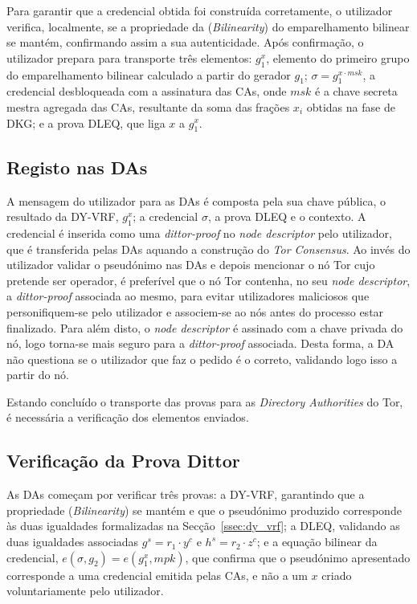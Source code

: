 Para garantir que a credencial obtida foi construída corretamente, o utilizador verifica, localmente, se a propriedade da (\textit{Bilinearity}) do emparelhamento bilinear se mantém, confirmando assim a sua autenticidade. Após confirmação, o utilizador prepara para transporte três elementos: $g_1^x$, elemento do primeiro grupo do emparelhamento bilinear calculado a partir do gerador $g_1$; $\sigma = g_1^{x \cdot msk}$, a credencial desbloqueada com a assinatura das CAs, onde $msk$ é a chave secreta mestra agregada das CAs, resultante da soma das frações $x_i$ obtidas na fase de DKG; e a prova DLEQ, que liga $x$ a $g_1^x$.

\subsection{Registo nas DAs}
\label{sub:dittor_protocolo_registo_das}

A mensagem do utilizador para as DAs é composta pela sua chave pública, o resultado da DY-VRF, $g_1^x$; a credencial $\sigma$, a prova DLEQ e o contexto. A credencial é inserida como uma \textit{dittor-proof} no \textit{node descriptor} pelo utilizador, que é transferida pelas DAs aquando a construção do \textit{Tor Consensus}. Ao invés do utilizador validar o pseudónimo nas DAs e depois mencionar o nó Tor cujo pretende ser operador, é preferível que o nó Tor contenha, no seu \textit{node descriptor}, a \textit{dittor-proof} associada ao mesmo, para evitar utilizadores maliciosos que personifiquem-se pelo utilizador e associem-se ao nós antes do processo estar finalizado. Para além disto, o \textit{node descriptor} é assinado com a chave privada do nó, logo torna-se mais seguro para a \textit{dittor-proof} associada. Desta forma, a DA não questiona se o utilizador que faz o pedido é o correto, validando logo isso a partir do nó.

Estando concluído o transporte das provas para as \textit{Directory Authorities} do Tor, é necessária a verificação dos elementos enviados.

\subsection{Verificação da Prova Dittor}
\label{sub:dittor_protocolo_verificacao}

As DAs começam por verificar três provas: a DY-VRF, garantindo que a propriedade (\textit{Bilinearity}) se mantém e que o pseudónimo produzido corresponde às duas igualdades formalizadas na Secção~\ref{ssec:dy_vrf}; a DLEQ, validando as duas igualdades associadas $g^s = r_1 \cdot y^c$ e $h^s = r_2 \cdot z^c$; e a equação bilinear da credencial, $e(\sigma, g_2) = e(g_1^x, mpk)$, que confirma que o pseudónimo apresentado corresponde a uma credencial emitida pelas CAs, e não a um $x$ criado voluntariamente pelo utilizador.

